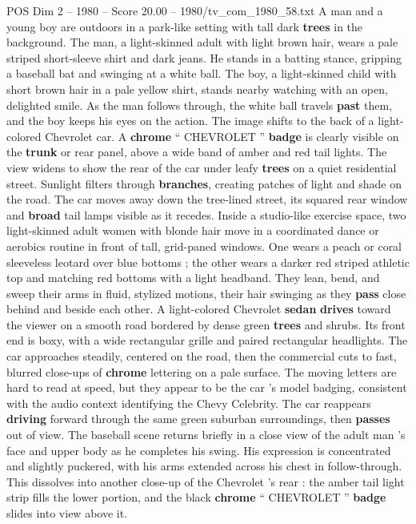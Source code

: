 \begin{textsample}{POS Dim 2 – 1980 – Score 20.00 – 1980/tv\_com\_1980\_58.txt}  \label{ex:f2_pos_062}
A man and a young boy are outdoors in a park-like setting with tall dark \textbf{trees} in the background.
The man, a light-skinned adult with light brown hair, wears a pale striped short-sleeve shirt and dark jeans.
He stands in a batting stance, gripping a baseball bat and swinging at a white ball.
The boy, a light-skinned child with short brown hair in a pale yellow shirt, stands nearby watching with an open, delighted smile.
As the man follows through, the white ball travels \textbf{past} them, and the boy keeps his eyes on the action.
The image shifts to the back of a light-colored Chevrolet car.
A \textbf{chrome} “ CHEVROLET ” \textbf{badge} is clearly visible on the \textbf{trunk} or rear panel, above a wide band of amber and red tail lights.
The view widens to show the rear of the car under leafy \textbf{trees} on a quiet residential street.
Sunlight filters through \textbf{branches}, creating patches of light and shade on the road.
The car moves away down the tree-lined street, its squared rear window and \textbf{broad} tail lamps visible as it recedes.
Inside a studio-like exercise space, two light-skinned adult women with blonde hair move in a coordinated dance or aerobics routine in front of tall, grid-paned windows.
One wears a peach or coral sleeveless leotard over blue bottoms ; the other wears a darker red striped athletic top and matching red bottoms with a light headband.
They lean, bend, and sweep their arms in fluid, stylized motions, their hair swinging as they \textbf{pass} close behind and beside each other.
A light-colored Chevrolet \textbf{sedan} \textbf{drives} toward the viewer on a smooth road bordered by dense green \textbf{trees} and shrubs.
Its front end is boxy, with a wide rectangular grille and paired rectangular headlights.
The car approaches steadily, centered on the road, then the commercial cuts to fast, blurred close-ups of \textbf{chrome} lettering on a pale surface.
The moving letters are hard to read at speed, but they appear to be the car ’s model badging, consistent with the audio context identifying the Chevy Celebrity.
The car reappears \textbf{driving} forward through the same green suburban surroundings, then \textbf{passes} out of view.
The baseball scene returns briefly in a close view of the adult man ’s face and upper body as he completes his swing.
His expression is concentrated and slightly puckered, with his arms extended across his chest in follow-through.
This dissolves into another close-up of the Chevrolet ’s rear : the amber tail light strip fills the lower portion, and the black \textbf{chrome} “ CHEVROLET ” \textbf{badge} slides into view above it.

\end{textsample}
